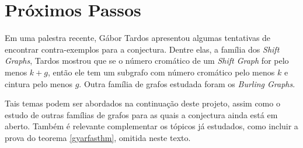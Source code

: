 \documentclass{article}
\begin{document}
\section{Próximos Passos}
Em uma palestra recente, Gábor Tardos apresentou algumas tentativas de encontrar contra-exemplos para a conjectura. Dentre elas, a família dos \textit{Shift Graphs}, Tardos mostrou que se o número cromático de um \textit{Shift Graph} for pelo menos $k+g$, então ele tem um subgrafo com número cromático pelo menos $k$ e cintura pelo menos $g$. Outra família de grafos estudada foram os \textit{Burling Graphs}.

Tais temas podem ser abordados na continuação deste projeto, assim como o estudo de outras famílias de grafos para as quais a conjectura ainda está em aberto. Também é relevante complementar os tópicos já estudados, como incluir a prova do teorema \ref{gyarfasthm}, omitida neste texto.




\endgroup %
\end{document}
